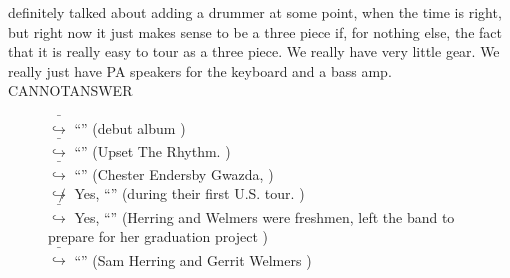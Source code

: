 \documentclass[11pt,a4paper, onecolumn]{article}
\begin{document}
definitely talked about adding a drummer at some point, when the time is right, but right now it just makes sense to be a three piece if, for nothing else, the fact that it is really easy to tour as a three piece. We really have very little gear. We really just have PA speakers for the keyboard and a bass amp. CANNOTANSWER

\begin{figure}[t] \small \begin{tcolorbox}[boxsep=0pt,left=5pt,right=0pt,top=2pt,colback = yellow!5] \begin{dialogue}
 \small 
\colorbox{pink!25}{ $\bar{\hookrightarrow}$}
{ ``'' (debut album ) }
\\
\colorbox{pink!25}{ $\bar{\hookrightarrow}$}
{ ``'' (Upset The Rhythm. ) }
\\
\colorbox{pink!25}{ $\bar{\hookrightarrow}$}
{ ``'' (Chester Endersby Gwazda, ) }
\\
\colorbox{pink!25}{$\not\hookrightarrow$}
\colorbox{red!25}{Yes,}
{ ``'' (during their first U.S. tour. ) }
\\
\colorbox{pink!25}{ $\bar{\hookrightarrow}$}
\colorbox{red!25}{Yes,}
{ ``'' (Herring and Welmers were freshmen, left the band to prepare for her graduation project ) }
\\
\colorbox{pink!25}{ $\bar{\hookrightarrow}$}
{ ``'' (Sam Herring and Gerrit Welmers ) }
\\
 \end{dialogue}\end{tcolorbox}\end{figure}
\end{document}
